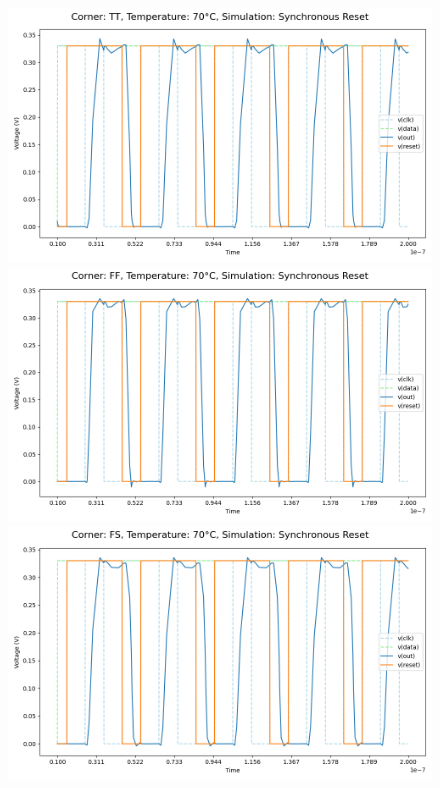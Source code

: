 \begin{figure}[H]
    \centering
    \includegraphics[height= 0.21\textheight]{figures/aimspice/TT/70/W3.csv.png}
    \vspace{5pt}
    \includegraphics[height= 0.21\textheight]{figures/aimspice/FF/70/W3.csv.png}
    \vspace{5pt}
    \includegraphics[height= 0.21\textheight]{figures/aimspice/FS/70/W3.csv.png}

\end{figure}
